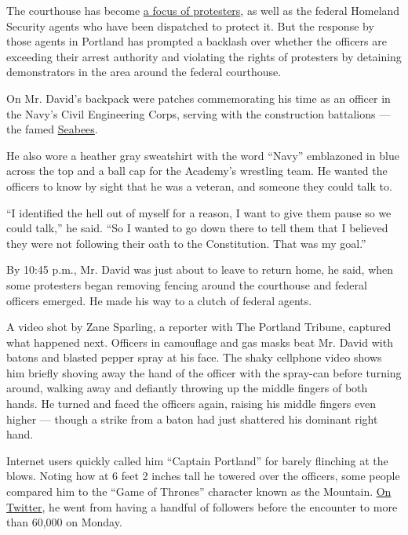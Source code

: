 The courthouse has become
\href{https://www.nytimes.com/2020/07/17/us/portland-protests.html}{a
focus of protesters}, as well as the federal Homeland Security agents
who have been dispatched to protect it. But the response by those agents
in Portland has prompted a backlash over whether the officers are
exceeding their arrest authority and violating the rights of protesters
by detaining demonstrators in the area around the federal courthouse.

On Mr. David's backpack were patches commemorating his time as an
officer in the Navy's Civil Engineering Corps, serving with the
construction battalions --- the famed
\href{https://www.navy.mil/navydata/personnel/seabees/seabee1.html}{Seabees}.

He also wore a heather gray sweatshirt with the word ``Navy'' emblazoned
in blue across the top and a ball cap for the Academy's wrestling team.
He wanted the officers to know by sight that he was a veteran, and
someone they could talk to.

``I identified the hell out of myself for a reason, I want to give them
pause so we could talk,'' he said. ``So I wanted to go down there to
tell them that I believed they were not following their oath to the
Constitution. That was my goal.''

By 10:45 p.m., Mr. David was just about to leave to return home, he
said, when some protesters began removing fencing around the courthouse
and federal officers emerged. He made his way to a clutch of federal
agents.

A video shot by Zane Sparling, a reporter with The Portland Tribune,
captured what happened next. Officers in camouflage and gas masks beat
Mr. David with batons and blasted pepper spray at his face. The shaky
cellphone video shows him briefly shoving away the hand of the officer
with the spray-can before turning around, walking away and defiantly
throwing up the middle fingers of both hands. He turned and faced the
officers again, raising his middle fingers even higher --- though a
strike from a baton had just shattered his dominant right hand.

Internet users quickly called him ``Captain Portland'' for barely
flinching at the blows. Noting how at 6 feet 2 inches tall he towered
over the officers, some people compared him to the ``Game of Thrones''
character known as the Mountain.
\href{https://twitter.com/Tazerface16}{On Twitter}, he went from having
a handful of followers before the encounter to more than 60,000 on
Monday.

